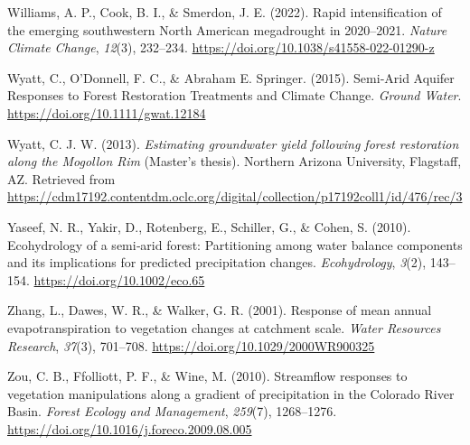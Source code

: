 \documentclass[
]{agujournal2019}
\newlength{\cslhangindent}
\newenvironment{CSLReferences}[2] %
 {\begin{list}{}{%
  \setlength{\itemindent}{0pt}
  \setlength{\leftmargin}{0pt}
  \setlength{\parsep}{0pt}
  \ifodd #1
   \setlength{\leftmargin}{\cslhangindent}
   \setlength{\itemindent}{-1\cslhangindent}
  \fi
  \setlength{\itemsep}{#2\baselineskip}}}
 {\end{list}}
\begin{document}
\begin{CSLReferences}{1}{0}
Williams, A. P., Cook, B. I., \& Smerdon, J. E. (2022). Rapid
intensification of the emerging southwestern {North} {American}
megadrought in 2020--2021. \emph{Nature Climate Change}, \emph{12}(3),
232--234. \url{https://doi.org/10.1038/s41558-022-01290-z}

Wyatt, C., O'Donnell, F. C., \& Abraham E. Springer. (2015). Semi‐{Arid}
{Aquifer} {Responses} to {Forest} {Restoration} {Treatments} and
{Climate} {Change}. \emph{Ground Water}.
\url{https://doi.org/10.1111/gwat.12184}

Wyatt, C. J. W. (2013). \emph{Estimating groundwater yield following
forest restoration along the {Mogollon} {Rim}} (Master's thesis).
Northern Arizona University, Flagstaff, AZ. Retrieved from
\url{https://cdm17192.contentdm.oclc.org/digital/collection/p17192coll1/id/476/rec/3}

Yaseef, N. R., Yakir, D., Rotenberg, E., Schiller, G., \& Cohen, S.
(2010). Ecohydrology of a semi‐arid forest: Partitioning among water
balance components and its implications for predicted precipitation
changes. \emph{Ecohydrology}, \emph{3}(2), 143--154.
\url{https://doi.org/10.1002/eco.65}

Zhang, L., Dawes, W. R., \& Walker, G. R. (2001). Response of mean
annual evapotranspiration to vegetation changes at catchment scale.
\emph{Water Resources Research}, \emph{37}(3), 701--708.
\url{https://doi.org/10.1029/2000WR900325}

Zou, C. B., Ffolliott, P. F., \& Wine, M. (2010). Streamflow responses
to vegetation manipulations along a gradient of precipitation in the
{Colorado} {River} {Basin}. \emph{Forest Ecology and Management},
\emph{259}(7), 1268--1276.
\url{https://doi.org/10.1016/j.foreco.2009.08.005}

\end{CSLReferences}
\end{document}
